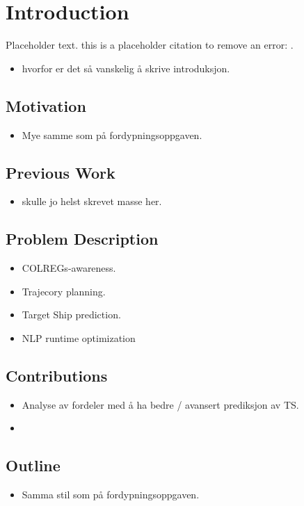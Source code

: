 \section{Introduction}
Placeholder text. this is a placeholder citation to remove an error: \cite{breivik2017mpc}.
\begin{itemize}
    \item hvorfor er det så vanskelig å skrive introduksjon.
\end{itemize}
\subsection{Motivation}
\begin{itemize}
    \item Mye samme som på fordypningsoppgaven.

\end{itemize}

\subsection{Previous Work}
\begin{itemize}
    \item skulle jo helst skrevet masse her.
\end{itemize}

\subsection{Problem Description}
\begin{itemize}
    \item COLREGs-awareness.
    \item Trajecory planning.
    \item Target Ship prediction.
    \item NLP runtime optimization
\end{itemize}

\subsection{Contributions}
\begin{itemize}
    \item Analyse av fordeler med å ha bedre / avansert prediksjon av TS.
    \item 
\end{itemize}

\subsection{Outline}
\begin{itemize}
    \item Samma stil som på fordypningsoppgaven.
\end{itemize}


\newpage
